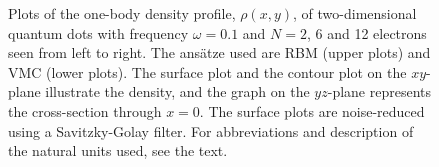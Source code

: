 \begin{figure}
	\hspace{0.1cm}
	\hspace{-0.cm}
	\hspace{-0.cm}
	
	\caption{Plots of the one-body density profile, $\rho(x, y)$, of two-dimensional quantum dots with frequency $\omega=0.1$ and $N=2$, 6 and 12 electrons seen from left to right. The ansätze used are RBM (upper plots) and VMC (lower plots). The surface plot and the contour plot on the $xy$-plane illustrate the density, and the graph on the $yz$-plane represents the cross-section through $x=0$. The surface plots are noise-reduced using a Savitzky-Golay filter. For abbreviations and description of the natural units used, see the text.}
	\label{fig:lowfreqRBM}
\end{figure}

\newpage
